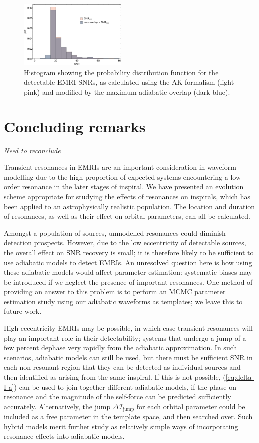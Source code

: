 \documentclass[aps,prd,amsfonts,amssymb,amsmath,nofootinbib,showpacs,superscriptaddress,twocolumn]{revtex4}
\newcommand{\eqnref}[1]{(\ref{eq:#1})}
\newcommand{\sub}[1]{\ensuremath{_\mathrm{#1}}}
\begin{document}
\begin{figure}
\centering
\includegraphics[width=0.46\textwidth]{pop_SNR_dist}
\caption{\label{fig:pop-SNR-dist}Histogram showing the probability distribution function for the detectable EMRI SNRs, as calculated using the AK formalism (light pink) and modified by the maximum adiabatic overlap (dark blue).}
\end{figure}

\section{Concluding remarks}
\label{sec:conclusion}

\emph{Need to reconclude}

Transient resonances in EMRIs are an important consideration in waveform modelling due to the high proportion of expected systems encountering a low-order resonance in the later stages of inspiral. We have presented an evolution scheme appropriate for studying the effects of resonances on inspirals, which has been applied to an astrophysically realistic population. The location and duration of resonances, as well as their effect on orbital parameters, can all be calculated.

Amongst a population of sources, unmodelled resonances could diminish detection prospects. However, due to the low eccentricity of detectable sources, the overall effect on SNR recovery is small; it is therefore likely to be sufficient to use adiabatic models to detect EMRIs. An unresolved question here is how using these adiabatic models would affect parameter estimation: systematic biases may be introduced if we neglect the presence of important resonances. One method of providing an answer to this problem is to perform an MCMC parameter estimation study using our adiabatic waveforms as templates; we leave this to future work.

High eccentricity EMRIs may be possible, in which case transient resonances will play an important role in their detectability; systems that undergo a jump of a few percent dephase very rapidly from the adiabatic approximation. In such scenarios, adiabatic models can still be used, but there must be sufficient SNR in each non-resonant region that they can be detected as individual sources and then identified as arising from the same inspiral. If this is not possible, \eqnref{delta-I-a} can be used to join together different adiabatic models, if the phase on resonance and the magnitude of the self-force can be predicted sufficiently accurately. Alternatively, the jump $\Delta\mathcal{I}\sub{jump}$ for each orbital parameter could be included as a free parameter in the template space, and then searched over. Such hybrid models merit further study as relatively simple ways of incorporating resonance effects into adiabatic models.
\end{document}
